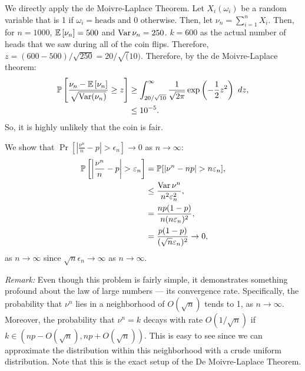 \begin{problem}{3}
\end{problem}
\begin{solution}
    We directly apply the de Moivre-Laplace Theorem. Let $X_i(\omega_i)$ be a random variable that is 1 if $\omega_i =\text{heads}$ and 0 otherwise. Then, let $\nu_n = \sum_{i=1}^n X_i$. Then, for $n=1000$, $\mathbb{E}\left[\nu_n\right] = 500$ and $\operatorname{Var}{\nu_n} = 250$. $k=600$ as the actual number of heads that we saw during all of the coin flips. Therefore, 
    $z = (600 - 500) / \sqrt{250} = 20/\sqrt(10)$. Therefore, by the de Moivre-Laplace theorem:
    \begin{align*}
        \mathbb{P}\left[\frac{\nu_n - \mathbb{E}\left[\nu_n\right]}{\sqrt{\operatorname{Var}(\nu_n)}} \geq z\right] &\geq \int_{20/\sqrt{10}}^\infty \frac{1}{\sqrt{2\pi}}\exp\left(-\frac{1}{2}z^2\right)~dz, \\
        &\leq 10^{-5}.
    \end{align*}
    So, it is highly unlikely that the coin is fair.
\end{solution}
\begin{problem}{4}
\end{problem}
\begin{solution}
    We show that $\Pr\left[\left|\frac{\nu^n}{n} - p\right| > \epsilon_n\right] \to 0$ as $n\to \infty$:
    \begin{align*}
        \mathbb{P}\left[\left|\frac{\nu^n}{n} - p\right| > \varepsilon_n\right] &= \mathbb{P}[|\nu^n - np| > n\varepsilon_n], \\
        &\leq \frac{\operatorname{Var}{\nu^n}}{n^2 \varepsilon_n^2}, \\
        &= \frac{np(1-p)}{n(n\varepsilon_n)^2}, \\
        &= \frac{p(1-p)}{(\sqrt{n}\varepsilon_n)^2} \to 0,
    \end{align*}
    as $n\to\infty$ since $\sqrt{n}\epsilon_n \to \infty$ as $n\to\infty$.

    \textcolor{brickred}{\textit{Remark:}} Even though this problem is fairly simple, it demonstrates something profound about the law of large numbers --- its convergence rate. Specifically, the probability that $\nu^n$ lies in a neighborhood of $O(\sqrt{n})$ tends to 1, as $n\to\infty$. Moreover, the probability that $\nu^n = k$ decays with rate $O(1/\sqrt{n})$ if $k \in (np - O(\sqrt{n}), np + O(\sqrt{n}))$. This is easy to see since we can approximate the distribution within this neighborhood with a crude uniform distribution. Note that this is the exact setup of the De Moivre-Laplace Theorem.
\end{solution}
